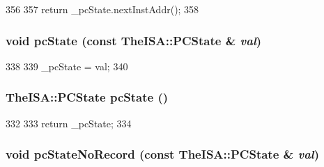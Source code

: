 \begin{DoxyCode}
356     {
357         return _pcState.nextInstAddr();
358     }
\end{DoxyCode}
\hypertarget{classSimpleThread_a5e9cfc754c9ef9b7db875ce89871944e}{
\subsubsection[{pcState}]{\setlength{\rightskip}{0pt plus 5cm}void pcState (const TheISA::PCState \& {\em val})}}
\label{classSimpleThread_a5e9cfc754c9ef9b7db875ce89871944e}



\begin{DoxyCode}
338     {
339         _pcState = val;
340     }
\end{DoxyCode}
\hypertarget{classSimpleThread_a827fb3454585cf4c620f4fd341966317}{
\subsubsection[{pcState}]{\setlength{\rightskip}{0pt plus 5cm}TheISA::PCState pcState ()}}
\label{classSimpleThread_a827fb3454585cf4c620f4fd341966317}



\begin{DoxyCode}
332     {
333         return _pcState;
334     }
\end{DoxyCode}
\hypertarget{classSimpleThread_a6005386aeeaecb35499c3199fb47ba2f}{
\subsubsection[{pcStateNoRecord}]{\setlength{\rightskip}{0pt plus 5cm}void pcStateNoRecord (const TheISA::PCState \& {\em val})}}
\label{classSimpleThread_a6005386aeeaecb35499c3199fb47ba2f}



